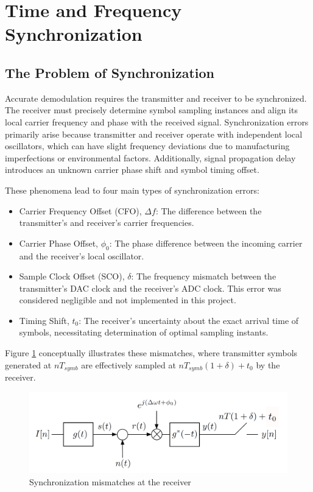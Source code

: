 \section{Time and Frequency Synchronization}
\subsection{The Problem of Synchronization}
Accurate demodulation requires the transmitter and receiver to be synchronized. The receiver must precisely determine symbol sampling instances and align its local carrier frequency and phase with the received signal. Synchronization errors primarily arise because transmitter and receiver operate with independent local oscillators, which can have slight frequency deviations due to manufacturing imperfections or environmental factors. Additionally, signal propagation delay introduces an unknown carrier phase shift and symbol timing offset.\par
These phenomena lead to four main types of synchronization errors:
\begin{itemize}
	\item Carrier Frequency Offset (CFO), $\Delta f$: The difference between the transmitter's and receiver's carrier frequencies.
	\item Carrier Phase Offset, $\phi_0$: The phase difference between the incoming carrier and the receiver's local oscillator.
	\item Sample Clock Offset (SCO), $\delta$: The frequency mismatch between the transmitter's DAC clock and the receiver's ADC clock. This error was considered negligible and not implemented in this project.
	\item Timing Shift, $t_0$: The receiver's uncertainty about the exact arrival time of symbols, necessitating determination of optimal sampling instants.
\end{itemize}
Figure \ref{fig:sync-errors-conceptual} conceptually illustrates these mismatches, where transmitter symbols generated at $nT_{symb}$ are effectively sampled at $nT_{symb}(1+\delta)+t_0$ by the receiver.
\begin{figure}[H]
	\centering
	\includegraphics[width=0.8\linewidth]{Images/sync-errors-conceptual} %
	\caption{Synchronization mismatches at the receiver}
	\label{fig:sync-errors-conceptual}
\end{figure}

